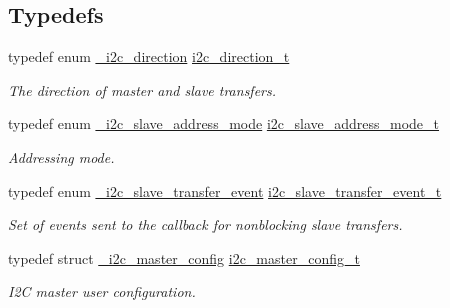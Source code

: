 \subsection*{Typedefs}
\begin{DoxyCompactItemize}
\item 
\mbox{\label{group__i2c__driver_ga4bf954d998f086594eece268c780bec7}} 
typedef enum \mbox{\hyperlink{group__i2c__driver_ga1625497320644ba123718bafdd2c1f39}{\+\_\+i2c\+\_\+direction}} \mbox{\hyperlink{group__i2c__driver_ga4bf954d998f086594eece268c780bec7}{i2c\+\_\+direction\+\_\+t}}
\begin{DoxyCompactList}\small\item\em The direction of master and slave transfers. \end{DoxyCompactList}\item 
\mbox{\label{group__i2c__driver_ga70379ff75d2f4591b8dc1ba107a2a606}} 
typedef enum \mbox{\hyperlink{group__i2c__driver_gae1e1e45d8491652a249bf48530911ac7}{\+\_\+i2c\+\_\+slave\+\_\+address\+\_\+mode}} \mbox{\hyperlink{group__i2c__driver_ga70379ff75d2f4591b8dc1ba107a2a606}{i2c\+\_\+slave\+\_\+address\+\_\+mode\+\_\+t}}
\begin{DoxyCompactList}\small\item\em Addressing mode. \end{DoxyCompactList}\item 
typedef enum \mbox{\hyperlink{group__i2c__driver_ga87e42e170b60f17f657ef3c06a918133}{\+\_\+i2c\+\_\+slave\+\_\+transfer\+\_\+event}} \mbox{\hyperlink{group__i2c__driver_ga95f120f6a73af41648364538cf9a6eca}{i2c\+\_\+slave\+\_\+transfer\+\_\+event\+\_\+t}}
\begin{DoxyCompactList}\small\item\em Set of events sent to the callback for nonblocking slave transfers. \end{DoxyCompactList}\item 
\mbox{\label{group__i2c__driver_gad739710b6b65e12ca5ba9dc2a2a2b463}} 
typedef struct \mbox{\hyperlink{struct__i2c__master__config}{\+\_\+i2c\+\_\+master\+\_\+config}} \mbox{\hyperlink{group__i2c__driver_gad739710b6b65e12ca5ba9dc2a2a2b463}{i2c\+\_\+master\+\_\+config\+\_\+t}}
\begin{DoxyCompactList}\small\item\em I2C master user configuration. \end{DoxyCompactList}\item 

\end{DoxyCompactItemize}

